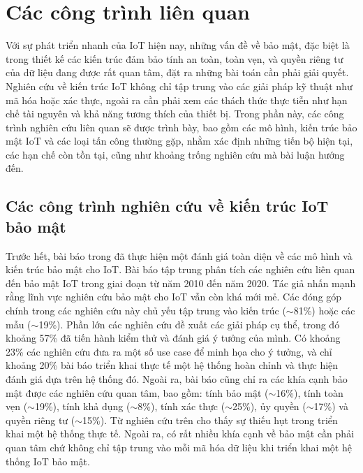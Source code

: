 \chapter{Các công trình liên quan}
\label{Chapter2}
Với sự phát triển nhanh của IoT hiện nay, những vấn đề về bảo mật, đặc biệt là trong thiết kế các kiến trúc đảm bảo tính an toàn, toàn vẹn, và quyền riêng tư của dữ liệu đang được rất quan tâm, đặt ra những bài toán cần phải giải quyết. Nghiên cứu về kiến trúc IoT không chỉ tập trung vào các giải pháp kỹ thuật như mã hóa hoặc xác thực, ngoài ra cần phải xem các thách thức thực tiễn như hạn chế tài nguyên và khả năng tương thích của thiết bị. Trong phần này, các công trình nghiên cứu liên quan sẽ được trình bày, bao gồm các mô hình, kiến trúc bảo mật IoT và các loại tấn công thường gặp, nhằm xác định những tiến bộ hiện tại, các hạn chế còn tồn tại, cũng như khoảng trống nghiên cứu mà bài luận hướng đến.

\section{Các công trình nghiên cứu về kiến trúc IoT bảo mật}
Trước hết, bài báo trong \cite{a-decade} đã thực hiện một đánh giá toàn diện về các mô hình và kiến trúc bảo mật cho IoT. Bài báo tập trung phân tích các nghiên cứu liên quan đến bảo mật IoT trong giai đoạn từ năm 2010 đến năm 2020. Tác giả nhấn mạnh rằng lĩnh vực nghiên cứu bảo mật cho IoT vẫn còn khá mới mẻ. Các đóng góp chính trong các nghiên cứu này chủ yếu tập trung vào kiến trúc ($\sim$81\%) hoặc các mẫu ($\sim$19\%). Phần lớn các nghiên cứu đề xuất các giải pháp cụ thể, trong đó khoảng 57\% đã tiến hành kiểm thử và đánh giá ý tưởng của mình. Có khoảng 23\% các nghiên cứu đưa ra một số use case để minh họa cho ý tưởng, và chỉ khoảng 20\% bài báo triển khai thực tế một hệ thống hoàn chỉnh và thực hiện đánh giá dựa trên hệ thống đó. Ngoài ra, bài báo \cite{a-decade} cũng chỉ ra các khía cạnh bảo mật được các nghiên cứu quan tâm, bao gồm: tính bảo mật ($\sim$16\%), tính toàn vẹn ($\sim$19\%), tính khả dụng ($\sim$8\%), tính xác thực ($\sim$25\%), ủy quyền ($\sim$17\%) và quyền riêng tư ($\sim$15\%). Từ nghiên cứu trên cho thấy sự thiếu hụt trong triển khai một hệ thống thực tế. Ngoài ra, có rất nhiều khía cạnh về bảo mật cần phải quan tâm chứ không chỉ tập trung vào mỗi mã hóa dữ liệu khi triển khai một hệ thống IoT bảo mật.

